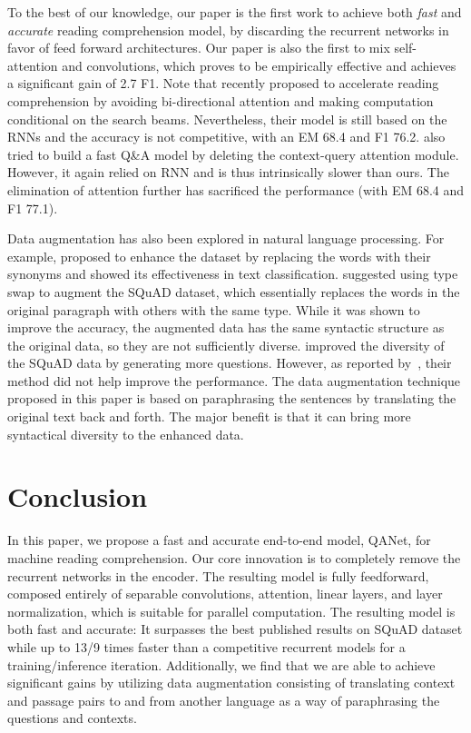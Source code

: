 \documentclass{article} \usepackage{iclr2018_conference,times}
\begin{document}
To the best of our knowledge, our paper is the first work  to achieve both \textit{fast} and \textit{accurate} reading comprehension model, by discarding the recurrent networks in favor of feed forward architectures. Our paper is also the first to mix self-attention and convolutions, which proves to be empirically effective and achieves a significant gain of 2.7 F1. Note that \cite{RaimanM17} recently proposed to accelerate reading comprehension by avoiding bi-directional
attention and making computation
conditional on the search beams. Nevertheless, their model is still based on the RNNs and the accuracy is not competitive, with an EM 68.4 and F1 76.2. \cite{WeissenbornWS17} also tried to build a fast Q\&A model by deleting the context-query attention module. However, it again relied on RNN and is thus intrinsically slower than ours. The elimination of attention further has sacrificed the performance (with EM 68.4 and F1 77.1). 


Data augmentation has also been explored in natural language processing. For example, \cite{ZhangZL15} proposed to enhance the dataset by replacing the words with their synonyms and showed its effectiveness in text classification. \cite{RaimanM17} suggested using type swap to augment the SQuAD dataset, which essentially replaces the words in the original paragraph with others with the same type. While it was shown to improve the accuracy, the augmented data has the same syntactic structure as the original data, so they are not sufficiently diverse. \cite{ZhouYWTBZ17} improved the diversity of the SQuAD data by generating more questions. However, as reported by~\cite{WangYWCZ17}, their method did not help improve the performance. The data augmentation technique proposed in this paper is based on paraphrasing the sentences by translating the original text back and forth. The major benefit is that it can bring more syntactical diversity to the enhanced data.


%
 \section{Conclusion}\label{sec:conclusion}

In this paper, we propose a fast and accurate end-to-end model, QANet, for machine reading comprehension. Our core innovation is to completely remove the recurrent networks in the encoder. The resulting model is fully feedforward, composed entirely of separable convolutions, attention, linear layers, and layer normalization, which is suitable for parallel computation.  The resulting model is both fast and accurate: It surpasses the best published results on SQuAD dataset while up to 13/9 times faster than a competitive recurrent models for a training/inference iteration.  Additionally, we find that we are able to achieve significant gains by utilizing data augmentation consisting of translating context and passage pairs to and from another language as a way of paraphrasing the questions and contexts. 
%
\end{document}
